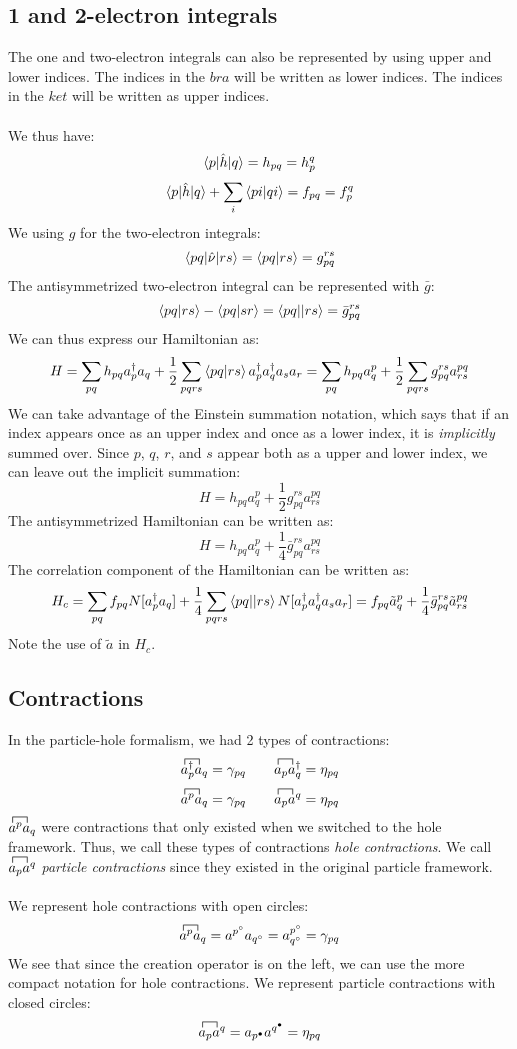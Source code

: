 \documentclass{article}
\newcommand{\fctr}{\contraction}
\newcommand{\dg}{\ensuremath{^\dagger} }
\newcommand{\apd}{\ensuremath{a_p^\dagger} }
\begin{document}
\subsection{1 and 2-electron integrals}
The one and two-electron integrals can also be represented by using upper and lower indices.
The indices in the $bra$ will be written as lower indices. 
The indices in the $ket$ will be written as upper indices. 
\\ \\
We thus have: 
\[\braket{p | \hat{h}| q} = h_{pq} = h_p^q \]
\[\braket{p | \hat{h}| q} + \sum_i \braket{pi | qi} = f_{pq} = f_p^q \]
We using $g$ for the two-electron integrals:
\[\braket{pq| \hat{\nu} | rs} = \braket{pq| rs} =g_{pq}^{rs} \]
The antisymmetrized two-electron integral can be represented with $\bar{g}$: 
\[\braket{pq| rs}  - \braket{pq| sr} = \braket{pq|| rs} =\bar{g}_{pq}^{rs} \]
We can thus express our Hamiltonian as: 
\[ H = \sum_{pq} h_{pq} \apd a_q + \frac{1}{2} \sum_{pqrs} \braket{pq|rs} \apd a_q\dg a_s a_r  = \sum_{pq} h_{pq} a_q^p + \frac{1}{2} \sum_{pqrs} g_{pq}^{rs} a^{pq}_{rs}  \] 
We can take advantage of the Einstein summation notation, which says that if an index appears once as an upper index and once as a lower index, it is \textit{implicitly} summed over. 
Since $p$, $q$, $r$, and $s$ appear both as a upper and lower index, we can leave out the implicit summation: 
\[ H  = h_{pq} a_q^p +  \frac{1}{2} g_{pq}^{rs} a^{pq}_{rs} \]
The antisymmetrized Hamiltonian can be written as: 
\[ H  = h_{pq} a_q^p +  \frac{1}{4} \bar{g}_{pq}^{rs} a^{pq}_{rs} \]
The correlation component of the Hamiltonian can be written as: 
\[ H_c  = \sum_{pq}f_{pq} N[\apd a_q  ] +  \frac{1}{4}\sum_{pqrs}  \braket{pq||rs}  N[\apd a_q\dg a_s a_r] =   f_{pq} \tilde{a}_q^p +  \frac{1}{4} \bar{g}_{pq}^{rs} \tilde{a}^{pq}_{rs} \]
Note the use of $\tilde{a}$ in $H_c$. 
\subsection{Contractions} 
In the particle-hole formalism, we had 2 types of contractions: 
\[\fctr{ }{a}{{}_p\dg}{a} a_p\dg a_q = \gamma_{pq} \quad \quad \fctr{ }{a}{{}_p}{a} a_p a_q\dg = \eta_{pq} \]
\[\fctr{ }{a}{{}^p}{a} a^p a_q = \gamma_{pq} \quad \quad \fctr{ }{a}{{}_p}{a} a_p a^q = \eta_{pq} \]
$\fctr{ }{a}{{}^p}{a} a^p a_q$ were contractions that only existed when we switched to the hole framework. 
Thus, we call these types of contractions \textit{hole contractions}. 
We call $\fctr{ }{a}{{}_p}{a} a_p a^q $ \textit{particle contractions} since they existed in the original particle framework.  \\ \\
We represent hole contractions with open circles: 
\[ \fctr{ }{a}{{}^p}{a}a^p a_q  = a^{p^\circ} a_{q^\circ} = a^{p^\circ}_{q^\circ} = \gamma_{pq} \]
We see that since the creation operator is on the left, we can use the more compact notation for hole contractions. 
We represent particle contractions with closed circles: 
\[ \fctr{ }{a}{{}_p}{a} a_p a^q  = a_{p^\bullet} a^{q^\bullet}  =  \eta_{pq} \]
\end{document}
